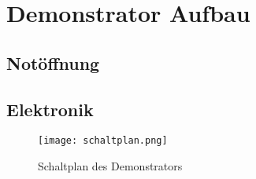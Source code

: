 \section{Demonstrator Aufbau}
\label{sys_sec:Demonstrator_Aufbau}

\subsection{Notöffnung}

\subsection{Elektronik}


\begin{figure}
\centering
\texttt{[image: schaltplan.png]}
\caption{Schaltplan des Demonstrators}
\end{figure}

